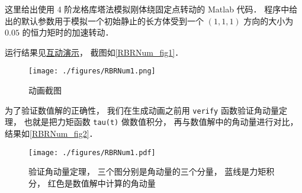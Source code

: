 

这里给出使用 4 阶龙格库塔法模拟刚体绕固定点转动的 Matlab 代码． 程序中给出的默认参数用于模拟一个初始静止的长方体受到一个 $(1,1,1)$ 方向的大小为 $0.05$ 的恒力矩时的加速转动．

运行结果见\href{http://wuli.wiki/apps/rigBdRot.html}{互动演示}， 截图如\autoref{RBRNum_fig1}．

\begin{figure}[ht]
\centering
\texttt{[image: ./figures/RBRNum1.png]}
\caption{动画截图} \label{RBRNum_fig1}
\end{figure}

为了验证数值解的正确性， 我们在生成动画之前用 \lstinline|verify| 函数验证角动量定理， 也就是把力矩函数 \lstinline|tau(t)| 做数值积分， 再与数值解中的角动量进行对比， 结果如\autoref{RBRNum_fig2}．
\begin{figure}[ht]
\centering
\texttt{[image: ./figures/RBRNum1.pdf]}
\caption{验证角动量定理， 三个图分别是角动量的三个分量， 蓝线是力矩积分， 红色是数值解中计算的角动量} \label{RBRNum_fig2}
\end{figure}

